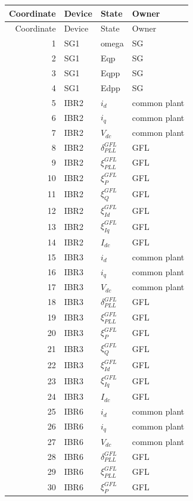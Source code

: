 \begin{longtable}{@{}r l l l@{}}
\toprule
Coordinate & Device & State & Owner \\ \midrule
\endfirsthead
\toprule
Coordinate & Device & State & Owner \\ \midrule
\endhead
1 & SG1 & omega & SG \\ 
2 & SG1 & Eqp & SG \\ 
3 & SG1 & Eqpp & SG \\ 
4 & SG1 & Edpp & SG \\ 
5 & IBR2 & $i_d$ & common plant \\ 
6 & IBR2 & $i_q$ & common plant \\ 
7 & IBR2 & $V_{dc}$ & common plant \\ 
8 & IBR2 & $\delta_{PLL}^{GFL}$ & GFL \\ 
9 & IBR2 & $\xi_{PLL}^{GFL}$ & GFL \\ 
10 & IBR2 & $\xi_{P}^{GFL}$ & GFL \\ 
11 & IBR2 & $\xi_{Q}^{GFL}$ & GFL \\ 
12 & IBR2 & $\xi_{Id}^{GFL}$ & GFL \\ 
13 & IBR2 & $\xi_{Iq}^{GFL}$ & GFL \\ 
14 & IBR2 & $I_{dc}$ & GFL \\ 
15 & IBR3 & $i_d$ & common plant \\ 
16 & IBR3 & $i_q$ & common plant \\ 
17 & IBR3 & $V_{dc}$ & common plant \\ 
18 & IBR3 & $\delta_{PLL}^{GFL}$ & GFL \\ 
19 & IBR3 & $\xi_{PLL}^{GFL}$ & GFL \\ 
20 & IBR3 & $\xi_{P}^{GFL}$ & GFL \\ 
21 & IBR3 & $\xi_{Q}^{GFL}$ & GFL \\ 
22 & IBR3 & $\xi_{Id}^{GFL}$ & GFL \\ 
23 & IBR3 & $\xi_{Iq}^{GFL}$ & GFL \\ 
24 & IBR3 & $I_{dc}$ & GFL \\ 
25 & IBR6 & $i_d$ & common plant \\ 
26 & IBR6 & $i_q$ & common plant \\ 
27 & IBR6 & $V_{dc}$ & common plant \\ 
28 & IBR6 & $\delta_{PLL}^{GFL}$ & GFL \\ 
29 & IBR6 & $\xi_{PLL}^{GFL}$ & GFL \\ 
30 & IBR6 & $\xi_{P}^{GFL}$ & GFL \\ 

\end{longtable}
